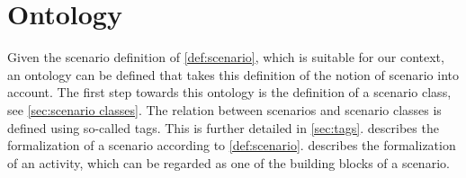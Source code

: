 \section{Ontology}
\label{sec:ontology}

Given the scenario definition of \cref{def:scenario}, which is suitable for our context, an ontology can be defined that takes this definition of the notion of scenario into account. The first step towards this ontology is the definition of a scenario class, see \cref{sec:scenario classes}. The relation between scenarios and scenario classes is defined using so-called tags. This is further detailed in \cref{sec:tags}.  describes the formalization of a scenario according to \cref{def:scenario}.  describes the formalization of an activity, which can be regarded as one of the building blocks of a scenario.





